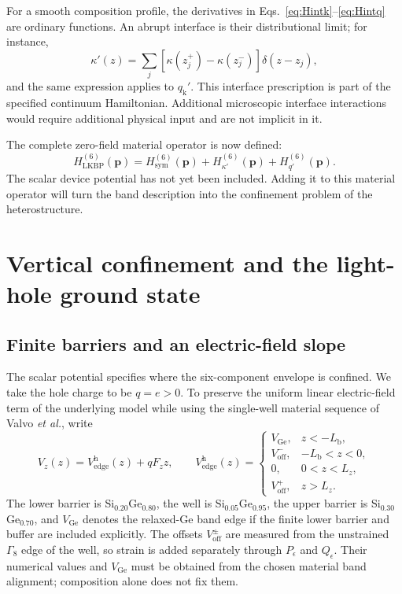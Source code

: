 \documentclass[10pt,letterpaper]{article}
\newcommand{\ep}{\epsilon}
\newcommand{\qq}{q_{\mathrm k}}
\begin{document}
For a smooth composition profile, the derivatives in Eqs.~\eqref{eq:Hintk}--\eqref{eq:Hintq} are ordinary functions. An abrupt interface is their distributional limit; for instance,
\begin{equation}
\kappa'(z)=\sum_j[\kappa(z_j^+)-\kappa(z_j^-)]\delta(z-z_j),
\label{eq:steps}
\end{equation}
and the same expression applies to $\qq'$. This interface prescription is part of the specified continuum Hamiltonian. Additional microscopic interface interactions would require additional physical input and are not implicit in it.

The complete zero-field material operator is now defined:
\begin{equation}
H_{\mathrm{LKBP}}^{(6)}(\bm p)
=H_{\mathrm{sym}}^{(6)}(\bm p)
+H_{\kappa'}^{(6)}(\bm p)+H_{q'}^{(6)}(\bm p).
\label{eq:HLKBP}
\end{equation}
The scalar device potential has not yet been included. Adding it to this material operator will turn the band description into the confinement problem of the heterostructure.

\section{Vertical confinement and the light-hole ground state}
\label{sec:vertical}

\subsection{Finite barriers and an electric-field slope}

The scalar potential specifies where the six-component envelope is confined. We take the hole charge to be $q=e>0$. To preserve the uniform linear electric-field term of the underlying model while using the single-well material sequence of Valvo \emph{et al.}, write
\begin{equation}
V_z(z)=V_{\mathrm{edge}}^{\mathrm h}(z)+qF_z z,
\qquad
V_{\mathrm{edge}}^{\mathrm h}(z)=
\begin{cases}
V_{\mathrm{Ge}},&z<-L_{\mathrm b},\\[2pt]
V_{\mathrm{off}}^-,&-L_{\mathrm b}<z<0,\\[2pt]
0,&0<z<L_z,\\[2pt]
V_{\mathrm{off}}^+,&z>L_z.
\end{cases}
\label{eq:Vz}
\end{equation}
The lower barrier is Si$_{0.20}$Ge$_{0.80}$, the well is Si$_{0.05}$Ge$_{0.95}$, the upper barrier is Si$_{0.30}$Ge$_{0.70}$, and $V_{\mathrm{Ge}}$ denotes the relaxed-Ge band edge if the finite lower barrier and buffer are included explicitly. The offsets $V_{\mathrm{off}}^{\pm}$ are measured from the unstrained $\Gamma_8$ edge of the well, so strain is added separately through $P_\ep$ and $Q_\ep$. Their numerical values and $V_{\mathrm{Ge}}$ must be obtained from the chosen material band alignment; composition alone does not fix them.
\end{document}
